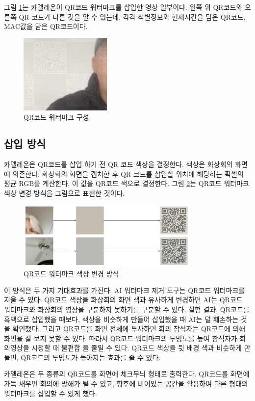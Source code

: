 그림 \ref{fig:qr_wm}는 카멜레온이  QR코드 워터마크를 삽입한 영상 일부이다. 왼쪽
위 QR코드와 오른쪽 QR 코드가 다른 것을 알 수 있는데, 각각 식별정보와 현재시간을
담은 QR코드, MAC값을 담은 QR코드이다.
\begin{figure}[ht]
    \vspace{10pt}
    \centering
    \includegraphics[width=0.4\textwidth]{imgs/qr_wm.png}
    \caption{QR코드 워터마크 구성}
    \label{fig:qr_wm}
\end{figure} 

\subsection*{삽입 방식}

카멜레온은 QR코드를 삽입 하기 전 QR 코드 색상을 결정한다. 색상은 화상회의 화면에
의존한다. 화상회의 화면을 캡처한 후 QR 코드를 삽입할 위치에 해당하는 픽셀의 평균
RGB를 계산한다. 이 값을 QR코드 색으로 결정한다. 그림 \ref{fig:qr_wm_color}는
QR코드 워터마크 색상 변경 방식을 그림으로 표현한 것이다.
\begin{figure}[ht]
    \vspace{10pt}
    \centering
    \includegraphics[width=0.8\textwidth]{imgs/qr_wm_color.png}
    \caption{QR코드 워터마크 색상 변경 방식}
    \label{fig:qr_wm_color}
\end{figure} 

이 방식은 두 가지 기대효과를 가진다. AI 워터마크 제거 도구는 QR코드 워터마크를
지울 수 있다. QR코드 색상을 화상회의 화면 색과 유사하게 변경하면 AI는 QR코드 워터마크와 화상회의
영상을 구분하지 못하기를 구분할 수 있다. 실험 결과, QR코드를 흑백으로 삽입했을
때보다, 색상을 비슷하게 만들어 삽입했을 때 AI는 덜 훼손하는 것을 확인했다.
그리고 QR코드를 화면 전체에 투사하면 회의 참석자는 QR코드에 의해 화면을 잘 보지 못할 수
있다. 따라서 QR코드 워터마크의 투명도를 높여 참석자가 회의영상을 시청할 때
불편함 을 줄일 수 있다. QR코드 색상을 뒷 배경 색과 비슷하게 만들면, QR코드의
투명도가 높아지는 효과를 줄 수 있다.

카멜레온은 두 종류의 QR코드를 화면에 체크무늬 형태로 출력한다. QR코드를 화면에 가득 채우면
회의에 방해가 될 수 있고, 향후에 비어있는 공간을 활용하여 다른 형태의
워터마크를 삽입할 수 있게 했다. 